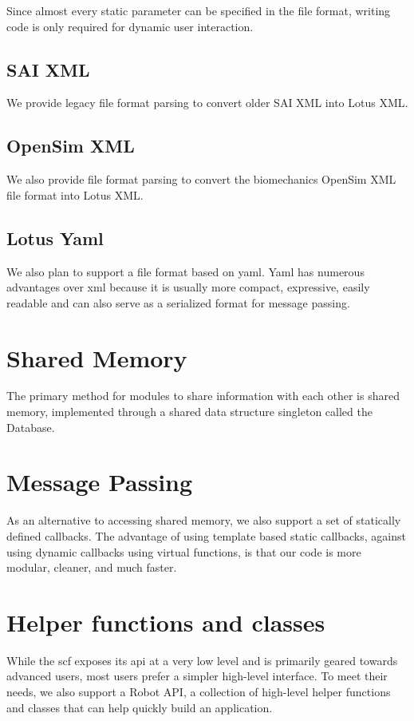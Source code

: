 \documentclass[12pt]{article}
\begin{document}
Since almost every static parameter can be specified in the file format, writing code
is only required for dynamic user interaction.

\subsection{SAI XML}
We provide legacy file format parsing to convert older SAI XML into Lotus XML.

\subsection{OpenSim XML}
We also provide file format parsing to convert the biomechanics OpenSim XML file format
into Lotus XML.

\subsection{Lotus Yaml}
We also plan to support a file format based on yaml. Yaml has numerous advantages over
xml because it is usually more compact, expressive, easily readable and can also serve
as a serialized format for message passing.

\section{Shared Memory}
The primary method for modules to share information with each other is shared memory,
implemented through a shared data structure singleton called the Database. 

\section{Message Passing}
As an alternative to accessing shared memory, we also support a set of statically 
defined callbacks. The advantage of using template based static callbacks, against 
using dynamic callbacks using virtual functions, is that our code is more modular,
cleaner, and much faster.

\section{Helper functions and classes}
While the scf exposes its api at a very low level and is primarily geared towards
advanced users, most users prefer a simpler high-level interface. To meet their needs,
we also support a Robot API, a collection of high-level helper functions and
classes that can help quickly build an application.
\end{document}
